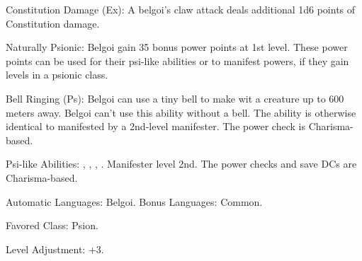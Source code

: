 \begin{itemize*}
    \item Constitution Damage (Ex): A belgoi's claw attack deals additional 1d6 points of Constitution damage.
    \item Naturally Psionic: Belgoi gain 35 bonus power points at 1st level. These power points can be used for their psi-like abilities or to manifest powers, if they gain levels in a psionic class.%
    \item Bell Ringing (Ps): Belgoi can use a tiny bell to make  wit a creature up to 600 meters away. Belgoi can't use this ability without a bell. The ability is otherwise identical to  manifested by a 2nd-level manifester. The power check is Charisma-based.
    \item Psi-like Abilities:
        ,
        ,
        ,
        .
    Manifester level 2nd. The power checks and save DCs are Charisma-based.

    \item Automatic Languages: Belgoi. Bonus Languages: Common.
    \item Favored Class: Psion.
    \item Level Adjustment: +3.
\end{itemize*}

